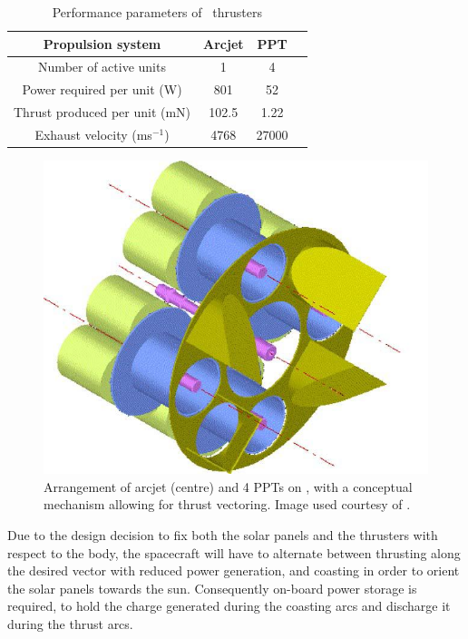\begin{table} [h]
\caption{Performance parameters of \BW\ thrusters} \label{tab:BW1-performance}
\centering
\begin{tabular} {cccc}\toprule
  Propulsion system & Arcjet & PPT \\\midrule
  Number of active units & 1 & 4 \\
  Power required per unit (W) & 801 & 52\\
  Thrust produced per unit (mN) & 102.5 & 1.22\\
  Exhaust velocity (ms$^{-1}$) & 4768 & 27000\\\bottomrule
\end{tabular}
\end{table}

\begin{figure} [h] 
\centering
\includegraphics[scale=0.25]{Images/thrust-vectoring.JPG}
\caption{Arrangement of arcjet (centre) and 4 PPTs on \BW, with a conceptual mechanism allowing for thrust vectoring. Image used courtesy of \textcite{Roeser2006}.} \label{fig:Thrust-vectoring}
\end{figure}

Due to the design decision to fix both the solar panels and the thrusters with respect to the body, the spacecraft will have to alternate between thrusting along the desired vector with reduced power generation, and coasting in order to orient the solar panels towards the sun. Consequently on-board power storage is required, to hold the charge generated during the coasting arcs and discharge it during the thrust arcs.

